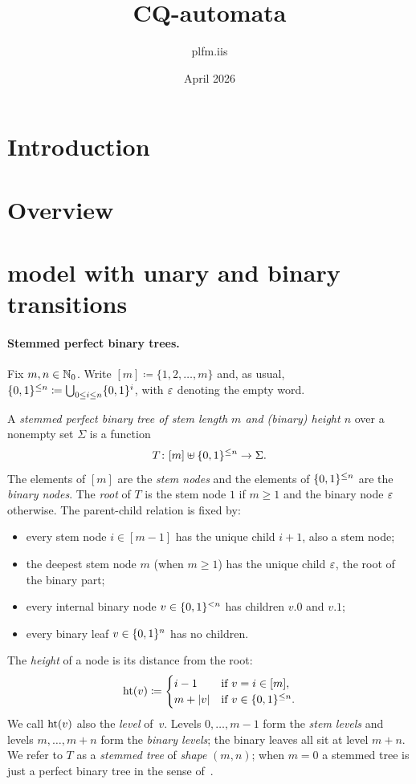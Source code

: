 \documentclass{article}
\title{CQ-automata}
\author{plfm.iis }
\date{April 2026}
\begin{document}
\maketitle

\section{Introduction}

\section{Overview}


\section{model with unary and binary transitions}

\paragraph{Stemmed perfect binary trees.}
Fix $m, n \in \mathbb{N}_{0}$.
Write $[m] \coloneq \{1, 2, \dots, m\}$ and, as usual,
$\{0,1\}^{\le n} \coloneq \bigcup_{0 \le i \le n} \{0,1\}^i$,
with $\varepsilon$ denoting the empty word.

A \emph{stemmed perfect binary tree of stem length $m$ and (binary) height $n$} over a nonempty set $\Sigma$ is a function
\[
T \colon [m] \uplus \{0,1\}^{\le n} \to \Sigma .
\]
The elements of $[m]$ are the \emph{stem nodes} and the elements of $\{0,1\}^{\le n}$ are the \emph{binary nodes}. The \emph{root} of $T$ is the stem node $1$ if $m \ge 1$ and the binary node $\varepsilon$ otherwise. The parent-child relation is fixed by:
\begin{itemize}
    \item every stem node $i \in [m-1]$ has the unique child $i + 1$, also a stem node;
    \item the deepest stem node $m$ (when $m \ge 1$) has the unique child $\varepsilon$, the root of the binary part;
    \item every internal binary node $v \in \{0,1\}^{<n}$ has children $v.0$ and $v.1$;
    \item every binary leaf $v \in \{0,1\}^n$ has no children.
\end{itemize}
The \emph{height} of a node is its distance from the root:
\[
\mathrm{ht}(v) \coloneq
\begin{cases}
i-1 & \text{if } v = i \in [m], \\
m + |v| & \text{if } v \in \{0,1\}^{\le n}.
\end{cases}
\]
We call $\mathrm{ht}(v)$ also the \emph{level} of~$v$.
Levels $0,\dots,m-1$ form the \emph{stem levels} and levels $m,\dots,m+n$ form the \emph{binary levels}; the binary leaves all sit at level $m+n$.
We refer to $T$ as a \emph{stemmed tree} of \emph{shape} $(m,n)$; when $m=0$ a stemmed tree is just a perfect binary tree in the sense of~\cite{LSTA2025}.
\end{document}
